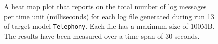\begin{figure}[htbp]
\centering
\begin{minipage}{1\textwidth}
  \centering
\end{minipage}
\caption{A heat map plot that reports on the total number of log messages per time unit (milliseconds) for each log file generated during run 13 of target model \texttt{Telephony}. Each file has a maximum size of 100MB. The results have been measured over a time span of 30 seconds.}
\label{figure:throughput_sum_random_det_telephony_13}
\end{figure}
